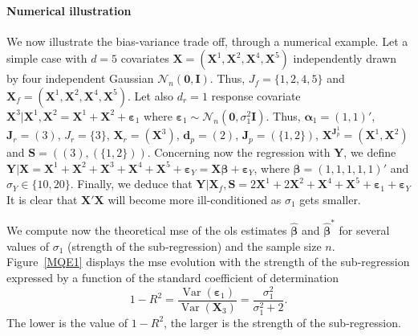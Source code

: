 \documentclass[11pt,a4paper]{article}
\begin{document}

\paragraph{Numerical illustration} We now illustrate the bias-variance trade off, through a numerical example. Let a simple case with $d=5$ covariates $\boldsymbol{X}=(\boldsymbol{X}^1,\boldsymbol{X}^2, \boldsymbol{X}^4, \boldsymbol{X}^5)$ independently drawn by four independent Gaussian $\mathcal{N}_n(\boldsymbol{0},\boldsymbol{I})$. Thus, $J_f=\{1,2,4,5\}$ and $\boldsymbol{X}_f=(\boldsymbol{X}^1,\boldsymbol{X}^2,\boldsymbol{X}^4,\boldsymbol{X}^5)$. Let also $d_r=1$ response covariate $\boldsymbol{X}^3|\boldsymbol{X}^1,\boldsymbol{X}^2=\boldsymbol{X}^1+\boldsymbol{X}^2+\boldsymbol{\varepsilon}_1$ where $\boldsymbol{\varepsilon}_1\sim{\mathcal{N}_n(\boldsymbol{0},\sigma_1^2\boldsymbol{I})}$. Thus, $\boldsymbol{\alpha}_1=(1,1)'$, $\boldsymbol{J}_r=(3)$, $J_r=\{3\}$, $\boldsymbol{X}_r=(\boldsymbol{X}^3)$, $\boldsymbol{d}_p=(2)$, $\boldsymbol{J}_p=(\{1,2\})$, $\boldsymbol{X}^{\boldsymbol{J}_p^1}=(\boldsymbol{X}^1,\boldsymbol{X}^2)$ and $\boldsymbol{S}=((3),(\{1,2\}))$. Concerning now the regression with $\boldsymbol{Y}$, we define $\boldsymbol{Y}|\boldsymbol{X}=\boldsymbol{X}^1+\boldsymbol{X}^2+\boldsymbol{X}^3+\boldsymbol{X}^4+\boldsymbol{X}^5+\boldsymbol{\varepsilon}_Y=\boldsymbol{X}\boldsymbol{\beta}+\boldsymbol{\varepsilon}_Y$, where $\boldsymbol{\beta}=(1,1,1,1,1)'$ and $\sigma_Y \in \{10,20\}$. Finally, we deduce that $\boldsymbol{Y}|\boldsymbol{X}_f,\boldsymbol{S}=2\boldsymbol{X}^1+2\boldsymbol{X}^2+\boldsymbol{X}^4+\boldsymbol{X}^5+\boldsymbol{\varepsilon}_1+\boldsymbol{\varepsilon}_Y$
It is clear that $\boldsymbol{X}'\boldsymbol{X}$ will become more ill-conditioned as $\sigma_1$ gets smaller.
	
We compute now the theoretical {\sc mse} of the {\sc ols} estimates $\hat{\boldsymbol{\beta}}$ and $\hat{\boldsymbol{\beta}}^*$ for several values of $\sigma_1$ (strength of the sub-regression) and the sample size $n$. Figure~\ref{MQE1} displays the {\sc mse} evolution with the strength of the sub-regression expressed by a function of the standard coefficient of determination
	\begin{equation}
		1-R^2=\frac{\operatorname{Var}(\boldsymbol{\varepsilon}_1)}{\operatorname{Var}(\boldsymbol{X}_3)}=\frac{\sigma_1^2}{\sigma_1^2+2}.
	\end{equation}
The lower is the value of $1-R^2$, the larger is the strength of the sub-regression.
	
\end{document}
